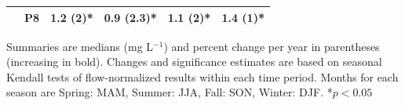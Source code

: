 \documentclass[letterpaper,12pt,oneside]{article}\usepackage[]{graphicx}\usepackage[]{color}
\begin{document}
\begin{table}[!tbp]
\begin{center}
\begin{tabular}{lllll}
~~P8&1.2 \footnotesize{(\textbf{2})*}&0.9 \footnotesize{(\textbf{2.3})*}&1.1 \footnotesize{(\textbf{2})*}&1.4 \footnotesize{(\textbf{1})*}\tabularnewline
\hline
\end{tabular}\end{center}
\footnotesize Summaries are  medians (mg L$^{-1}$) and percent change per year in parentheses (increasing in bold). Changes and significance estimates are based on seasonal Kendall tests of flow-normalized results within each time period. Months for each season are Spring: MAM, Summer: JJA, Fall: SON, Winter: DJF. *$p<0.05$\end{table}


\end{document}
